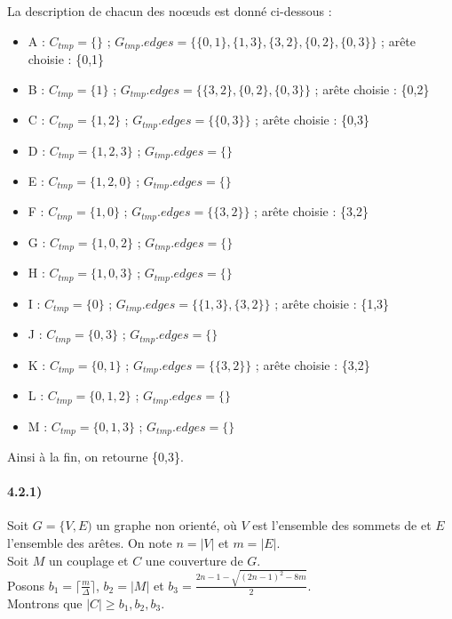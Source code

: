 \documentclass[12pt]{article}
\begin{document}
        La description de chacun des noœuds est donné ci-dessous :

        \begin{itemize}
            \item A : $C_{tmp} = \{\}$ ; $G_{tmp}.edges=\{\{0,1\},\{1,3\},\{3,2\},\{0,2\},\{0,3\}\}$ ; arête choisie : \{0,1\}
            \item B : $C_{tmp} = \{1\}$ ; $G_{tmp}.edges=\{\{3,2\},\{0,2\},\{0,3\}\}$ ; arête choisie : \{0,2\}
            \item C : $C_{tmp} = \{1,2\}$ ; $G_{tmp}.edges=\{\{0,3\}\}$ ; arête choisie : \{0,3\}
            \item D : $C_{tmp} = \{1,2,3\}$ ; $G_{tmp}.edges=\{\}$
            \item E : $C_{tmp} = \{1,2,0\}$ ; $G_{tmp}.edges=\{\}$
            \item F : $C_{tmp} = \{1,0\}$ ; $G_{tmp}.edges=\{\{3,2\}\}$ ; arête choisie : \{3,2\}
            \item G : $C_{tmp} = \{1,0,2\}$ ; $G_{tmp}.edges=\{\}$
            \item H : $C_{tmp} = \{1,0,3\}$ ; $G_{tmp}.edges=\{\}$
            \item I : $C_{tmp} = \{0\}$ ; $G_{tmp}.edges=\{\{1,3\},\{3,2\}\}$ ; arête choisie : \{1,3\}
            \item J : $C_{tmp} = \{0,3\}$ ; $G_{tmp}.edges=\{\}$
            \item K : $C_{tmp} = \{0,1\}$ ; $G_{tmp}.edges=\{\{3,2\}\}$ ; arête choisie : \{3,2\}
            \item L : $C_{tmp} = \{0,1,2\}$ ; $G_{tmp}.edges=\{\}$
            \item M : $C_{tmp} = \{0,1,3\}$ ; $G_{tmp}.edges=\{\}$
        \end{itemize}

        Ainsi à la fin, on retourne \{0,3\}.

    \paragraph{4.2.1)}
        Soit $G=\{V,E)$ un graphe non orienté, où $V$ est l'ensemble des sommets de et $E$ l'ensemble des arêtes. On note $n = |V|$ et $m = |E|$. \\
        Soit $M$ un couplage et $C$ une couverture de $G$. \\
        Posons $b_1 = \lceil \frac{m}{\Delta} \rceil$, $b_2 = |M|$ et $b_3 = \frac{2n-1 - \sqrt{(2n-1)^2 - 8m}}{2}$. \\
        Montrons que $|C| \geq b_1,b_2,b_3$.
\end{document}
